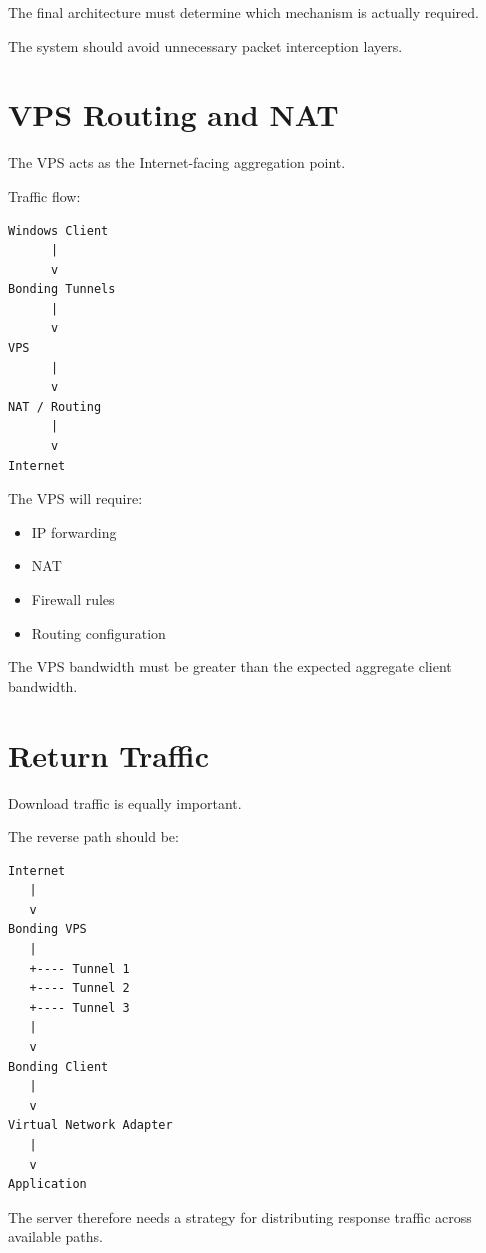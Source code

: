 \documentclass[12pt,a4paper]{article}
\begin{document}
The final architecture must determine which mechanism is actually required.

The system should avoid unnecessary packet interception layers.


\section{VPS Routing and NAT}

The VPS acts as the Internet-facing aggregation point.

Traffic flow:

\begin{verbatim}
Windows Client
      |
      v
Bonding Tunnels
      |
      v
VPS
      |
      v
NAT / Routing
      |
      v
Internet
\end{verbatim}

The VPS will require:

\begin{itemize}
    \item IP forwarding
    \item NAT
    \item Firewall rules
    \item Routing configuration
\end{itemize}

The VPS bandwidth must be greater than the expected aggregate client bandwidth.


\section{Return Traffic}

Download traffic is equally important.

The reverse path should be:

\begin{verbatim}
Internet
   |
   v
Bonding VPS
   |
   +---- Tunnel 1
   +---- Tunnel 2
   +---- Tunnel 3
   |
   v
Bonding Client
   |
   v
Virtual Network Adapter
   |
   v
Application
\end{verbatim}

The server therefore needs a strategy for distributing response traffic across available paths.
\end{document}

